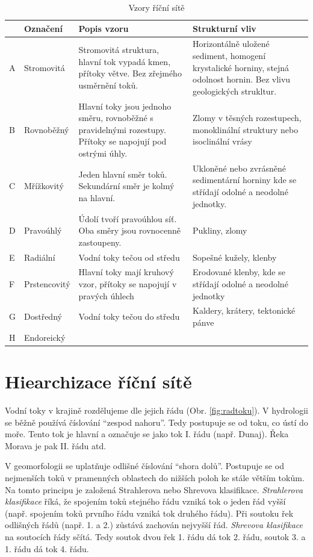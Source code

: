 \begin{table}[]
	\begin{tabularx}{\textwidth}{@{}llXX@{}}
		\toprule
		& Označení & Popis vzoru & Strukturní vliv \\ \midrule
		A & Stromovitá & Stromovitá struktura, hlavní tok vypadá kmen, přítoky větve. Bez zřejmého   usměrnění toků. & Horizontálně uložené sediment, homogení krystalické horniny, stejná   odolnost hornin. Bez vlivu geologických strukltur. \\
		B & Rovnoběžný & Hlavní toky jsou jednoho směru, rovnoběžné s pravidelnými rozestupy.   Přítoky se napojují pod ostrými úhly. & Zlomy v těsných rozestupech, monoklinální struktury nebo isoclinální   vrásy \\
		C & Mřížkovitý & Jeden hlavní směr toků. Sekundární směr je kolmý na hlavní. & Ukloněné nebo zvrásněné sedimentární horniny kde se střídají odolné a   neodolné jednotky. \\
		D & Pravoúhlý & Údolí tvoří pravoúhlou síť. Oba směry jsou rovnocenně zastoupeny. & Pukliny, zlomy \\
		E & Radiální & Vodní toky tečou od středu & Sopešné kužely, klenby \\
		F & Prstencovitý & Hlavní toky mají kruhový vzor, přítoky se napojují v pravých úhlech & Erodované klenby, kde se střídají odolné a neodolné jednotky \\
		G & Dostředný & Vodní toky tečou do středu & Kaldery, krátery, tektonické pánve \\
		H & Endoreický &  &  \\ \bottomrule
	\end{tabularx}
	\caption{Vzory říční sítě}
	\label{tab:ricni_sit}
\end{table}


\section{Hiearchizace říční sítě}
Vodní toky v krajině rozdělujeme dle jejich řádu (Obr. \ref{fig:radtoku}). V hydrologii se běžně používá číslování \enquote{zespod nahoru}. Tedy postupuje se od toku, co ústí do moře. Tento tok je hlavní a označuje se jako tok I. řádu (např. Dunaj). Řeka Morava je pak II. řádu atd.

V geomorfologii se uplatňuje odlišné číslování \enquote{shora dolů}. Postupuje se od nejmenších toků v pramenných oblastech do nižších poloh ke stále větším tokům. Na tomto principu je založená Strahlerova nebo Shrevova klasifikace. \emph{Strahlerova klasifikace} říká, že spojením toků stejného řádu vzniká tok o jeden řád vyšší (např. spojením toků prvního řádu vzniká tok druhého řádu). Při soutoku řek odlišných řádů (např. 1. a 2.) zůstává zachován nejvyšší řád. \emph{Shrevova klasifikace} na soutocích řády sčítá. Tedy soutok dvou řek 1. řádu dá tok 2. řádu, soutok 3. a 1. řádu dá tok 4. řádu. 


